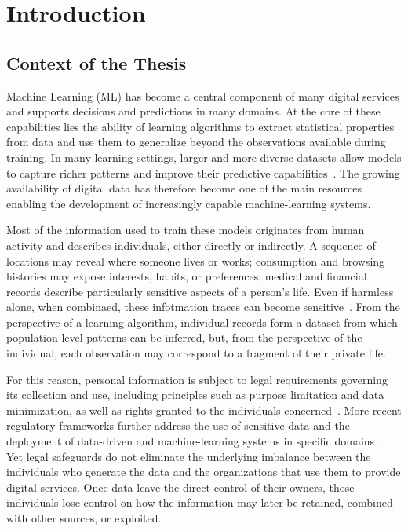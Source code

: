 \chapter{Introduction}\label{chap:intro}
\section{Context of the Thesis}\label{sec:context}

Machine Learning (ML) has become a central component of many digital services and supports decisions and predictions in many domains. At the core of these capabilities lies the ability of learning algorithms to extract statistical properties from data and use them to generalize beyond the observations available during training. In many learning settings, larger and more diverse datasets allow models to capture richer patterns and improve their predictive capabilities~\cite{banko-brill-2001-scaling,shalev2014understanding,hestness2017deeplearningscalingpredictable,kaplan2020scalinglawsneurallanguage}. The growing availability of digital data has therefore become one of the main resources enabling the development of increasingly capable machine-learning systems.

Most of the information used to train these models originates from human activity and describes individuals, either directly or indirectly. A sequence of locations may reveal where someone lives or works; consumption and browsing histories may expose interests, habits, or preferences; medical and financial records describe particularly sensitive aspects of a person's life.
Even if harmless alone, when combinaed, these infotmation traces can become sensitive~\cite{narayanan2008robust}. From the perspective of a learning algorithm, individual records form a dataset from which population-level patterns can be inferred, but, from the perspective of the individual, each observation may correspond to a fragment of their private life.


For this reason, personal information is subject to legal requirements governing its collection and use, including principles such as purpose limitation and data minimization, as well as rights granted to the individuals concerned~\cite{eu_gdpr_2016,california_ccpa_cpra}. More recent regulatory frameworks further address the use of sensitive data and the deployment of data-driven and machine-learning systems in specific domains~\cite{eu_ai_act_2024,eu_ehds_2025,Buick_copyright}. Yet legal safeguards do not eliminate the underlying imbalance between the individuals who generate the data and the organizations that use them to provide digital services. Once data leave the direct control of their owners, those individuals lose control on how the information may later be retained, combined with other sources, or exploited.


